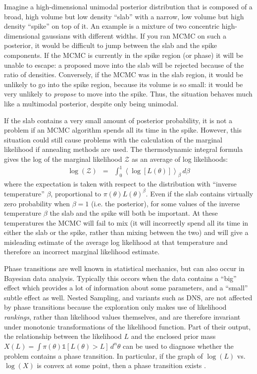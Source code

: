 \documentclass[useAMS,usenatbib]{mn2e}
\begin{document}
Imagine a high-dimensional unimodal posterior distribution that is composed of a
broad, high volume but low density ``slab'' with a narrow, low volume but high
density ``spike'' on top of it.
An example is a mixture of two concentric high-dimensional gaussians with
different widths. If you ran MCMC on such a posterior, it would be difficult
to jump between the slab and the spike components. If the MCMC is currently
in the spike region (or phase) it will be unable to escape: a proposed move
into the slab will be rejected because of the ratio of densities. Conversely,
if the MCMC was in the slab region, it would be unlikely to go into the spike
region, because its volume is so small: it would be very unlikely to
{\it propose} to move into the spike. Thus, the situation behaves much like
a multimodal posterior, despite only being unimodal.

If the slab contains a very small amount of posterior probability, it is not
a problem if an MCMC algorithm spends all its time in the spike. However, this
situation could still cause problems with the calculation of the marginal likelihood
if annealing methods are used. The thermodynamic integral formula gives
the log of the marginal likelihood $\mathcal{Z}$ as an average of log likelihoods:
\begin{eqnarray}
\log(\mathcal{Z}) &=& \int_0^1 \left<\log\left[L(\theta)\right]\right>_\beta \, d\beta
\end{eqnarray}
where the expectation is taken with respect to the
distribution with ``inverse temperature'' $\beta$, proportional to
$\pi(\theta)L(\theta)^\beta$. Even if the slab contains virtually zero probability
when $\beta=1$ (i.e. the posterior), for some values of the inverse temperature
$\beta$ the slab and the spike will both be important. At
these temperatures the MCMC will fail to mix (it will incorrectly spend all its
time in either the slab or the spike, rather than mixing between the two)
and will give a misleading estimate of the average log likelihood at that temperature
and therefore an incorrect marginal likelihood estimate.

Phase transitions are well known in statistical mechanics, but can also occur
in Bayesian data analysis. Typically this occors when the data contains
a ``big'' effect which provides a lot of information about some parameters, and
a ``small'' subtle effect as well.
Nested Sampling, and variants such as DNS, are not affected
by phase transitions because the exploration only makes use of likelihood
{\it rankings}, rather than likelihood values themselves, and are therefore
invariant under monotonic transformations of the likelihood function.
Part of their output, the relationship between the
likelihood $L$ and the enclosed prior mass
$X(L) = \int \pi(\theta) \mathds{1}\left[L(\theta) > L\right]\, d^n\theta$
can be used to diagnose whether the
problem contains a phase transition. In particular, if the graph of $\log(L)$
vs. $\log(X)$ is convex at some point, then a phase transition exists
\citep{skilling}.
\end{document}
